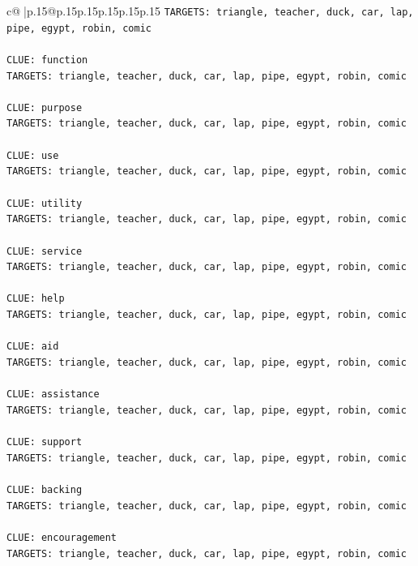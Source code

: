 \documentclass{article}
\begin{document}
{\begin{supertabular}{c@{$\;$}|p{.15\linewidth}@{}p{.15\linewidth}p{.15\linewidth}p{.15\linewidth}p{.15\linewidth}p{.15\linewidth}}
{{{\texttt{TARGETS: triangle, teacher, duck, car, lap, pipe, egypt, robin, comic} \\
\\ 
\texttt{CLUE: function} \\
\texttt{TARGETS: triangle, teacher, duck, car, lap, pipe, egypt, robin, comic} \\
\\ 
\texttt{CLUE: purpose} \\
\texttt{TARGETS: triangle, teacher, duck, car, lap, pipe, egypt, robin, comic} \\
\\ 
\texttt{CLUE: use} \\
\texttt{TARGETS: triangle, teacher, duck, car, lap, pipe, egypt, robin, comic} \\
\\ 
\texttt{CLUE: utility} \\
\texttt{TARGETS: triangle, teacher, duck, car, lap, pipe, egypt, robin, comic} \\
\\ 
\texttt{CLUE: service} \\
\texttt{TARGETS: triangle, teacher, duck, car, lap, pipe, egypt, robin, comic} \\
\\ 
\texttt{CLUE: help} \\
\texttt{TARGETS: triangle, teacher, duck, car, lap, pipe, egypt, robin, comic} \\
\\ 
\texttt{CLUE: aid} \\
\texttt{TARGETS: triangle, teacher, duck, car, lap, pipe, egypt, robin, comic} \\
\\ 
\texttt{CLUE: assistance} \\
\texttt{TARGETS: triangle, teacher, duck, car, lap, pipe, egypt, robin, comic} \\
\\ 
\texttt{CLUE: support} \\
\texttt{TARGETS: triangle, teacher, duck, car, lap, pipe, egypt, robin, comic} \\
\\ 
\texttt{CLUE: backing} \\
\texttt{TARGETS: triangle, teacher, duck, car, lap, pipe, egypt, robin, comic} \\
\\ 
\texttt{CLUE: encouragement} \\
\texttt{TARGETS: triangle, teacher, duck, car, lap, pipe, egypt, robin, comic} \\
}}}
\end{supertabular}}
\end{document}
